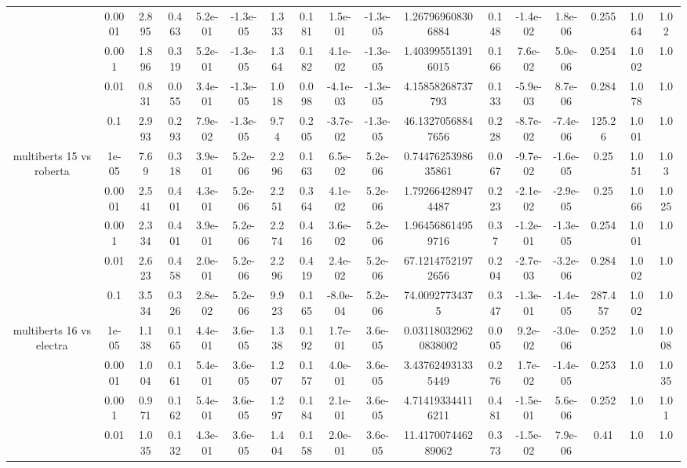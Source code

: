 \begin{tabular}{|c|c|c|c|c|c|c|c|c|c|c|c|c|c|c|c|c|}
 & 0.0001 & 2.895 & 0.463 & 5.2e-01 & -1.3e-05 & 1.333 & 0.181 & 1.5e-01 & -1.3e-05 & 1.267969608306884 & 0.148 & -1.4e-02 & 1.8e-06 & 0.255 & 1.064 & 1.02 \\
 & 0.001 & 1.896 & 0.319 & 5.2e-01 & -1.3e-05 & 1.364 & 0.182 & 4.1e-02 & -1.3e-05 & 1.403995513916015 & 0.166 & 7.6e-02 & 5.0e-06 & 0.254 & 1.002 & 1.0 \\
 & 0.01 & 0.831 & 0.055 & 3.4e-01 & -1.3e-05 & 1.018 & 0.098 & -4.1e-03 & -1.3e-05 & 4.15858268737793 & 0.133 & -5.9e-03 & 8.7e-06 & 0.284 & 1.078 & 1.0 \\
 & 0.1 & 2.993 & 0.293 & 7.9e-02 & -1.3e-05 & 9.74 & 0.205 & -3.7e-02 & -1.3e-05 & 46.13270568847656 & 0.228 & -8.7e-02 & -7.4e-06 & 125.26 & 1.001 & 1.0 \\
\hline
\multirow{5}{*}{multiberts 15 vs roberta } & 1e-05 & 7.69 & 0.318 & 3.9e-01 & 5.2e-06 & 2.296 & 0.163 & 6.5e-02 & 5.2e-06 & 0.7447625398635861 & 0.067 & -9.7e-02 & -1.6e-05 & 0.25 & 1.051 & 1.03 \\
 & 0.0001 & 2.541 & 0.401 & 4.3e-01 & 5.2e-06 & 2.251 & 0.364 & 4.1e-02 & 5.2e-06 & 1.792664289474487 & 0.223 & -2.1e-02 & -2.9e-05 & 0.25 & 1.066 & 1.025 \\
 & 0.001 & 2.334 & 0.401 & 3.9e-01 & 5.2e-06 & 2.274 & 0.416 & 3.6e-02 & 5.2e-06 & 1.964568614959716 & 0.37 & -1.2e-01 & -1.3e-05 & 0.254 & 1.001 & 1.0 \\
 & 0.01 & 2.623 & 0.458 & 2.0e-01 & 5.2e-06 & 2.296 & 0.419 & 2.4e-02 & 5.2e-06 & 67.12147521972656 & 0.204 & -2.7e-03 & -3.2e-06 & 0.284 & 1.002 & 1.0 \\
 & 0.1 & 3.534 & 0.326 & 2.8e-02 & 5.2e-06 & 9.923 & 0.165 & -8.0e-04 & 5.2e-06 & 74.00927734375 & 0.347 & -1.3e-01 & -1.4e-05 & 287.457 & 1.002 & 1.0 \\
\hline
\multirow{5}{*}{multiberts 16 vs electra } & 1e-05 & 1.138 & 0.165 & 4.4e-01 & 3.6e-05 & 1.338 & 0.192 & 1.7e-01 & 3.6e-05 & 0.031180329620838002 & 0.005 & 9.2e-02 & -3.0e-06 & 0.252 & 1.0 & 1.008 \\
 & 0.0001 & 1.004 & 0.161 & 5.4e-01 & 3.6e-05 & 1.207 & 0.157 & 4.0e-01 & 3.6e-05 & 3.437624931335449 & 0.276 & 1.7e-02 & -1.4e-05 & 0.253 & 1.0 & 1.035 \\
 & 0.001 & 0.971 & 0.162 & 5.4e-01 & 3.6e-05 & 1.297 & 0.184 & 2.1e-01 & 3.6e-05 & 4.714193344116211 & 0.481 & -1.5e-01 & 5.6e-06 & 0.252 & 1.0 & 1.01 \\
 & 0.01 & 1.035 & 0.132 & 4.3e-01 & 3.6e-05 & 1.404 & 0.158 & 2.0e-01 & 3.6e-05 & 11.417007446289062 & 0.373 & -1.5e-02 & 7.9e-06 & 0.41 & 1.0 & 1.0 \\

\end{tabular}
